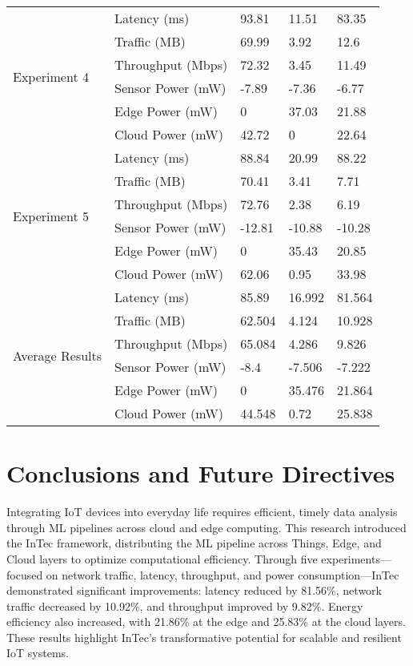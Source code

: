 \documentclass[11pt]{article}
\begin{document}
\begin{table}[t]
{\begin{tabular}{@{}lllll@{}}
				\midrule
				\multirow{6}{*}{Experiment 4} & Latency (ms) & 93.81 & 11.51 & 83.35 \\
				& Traffic (MB) & 69.99 & 3.92 & 12.6 \\
				& Throughput (Mbps) & 72.32 & 3.45 & 11.49 \\
				& Sensor Power (mW) & -7.89 & -7.36 & -6.77 \\
				& Edge Power (mW) & 0 & 37.03 & 21.88 \\
				& Cloud Power (mW) & 42.72 & 0 & 22.64 \\
				\midrule
				\multirow{6}{*}{Experiment 5} & Latency (ms) & 88.84 & 20.99 & 88.22 \\
				& Traffic (MB) & 70.41 & 3.41 & 7.71 \\
				& Throughput (Mbps) & 72.76 & 2.38 & 6.19 \\
				& Sensor Power (mW) & -12.81 & -10.88 & -10.28 \\
				& Edge Power (mW) & 0 & 35.43 & 20.85 \\
				& Cloud Power (mW) & 62.06 & 0.95 & 33.98 \\
				\midrule
				\multirow{6}{*}{Average Results} & Latency (ms) & 85.89 & 16.992 & 81.564 \\
				& Traffic (MB) & 62.504 & 4.124 & 10.928 \\
				& Throughput (Mbps) & 65.084 & 4.286 & 9.826 \\
				& Sensor Power (mW) & -8.4 & -7.506 & -7.222 \\
				& Edge Power (mW) & 0 & 35.476 & 21.864 \\
				& Cloud Power (mW) & 44.548 & 0.72 & 25.838 \\
				\bottomrule
			\end{tabular}
		}
	\end{table}
	
	\section{Conclusions and Future Directives}
	Integrating IoT devices into everyday life requires efficient, timely data analysis
	through ML pipelines across cloud and edge computing. This research introduced
	the InTec framework, distributing the ML pipeline across Things, Edge, and Cloud
	layers to optimize computational efficiency. Through five experiments—focused on
	network traffic, latency, throughput, and power consumption—InTec demonstrated
	significant improvements: latency reduced by 81.56\%, network traffic decreased by
	10.92\%, and throughput improved by 9.82\%. Energy efficiency also increased, with
	21.86\% at the edge and 25.83\% at the cloud layers. These results highlight InTec’s
	transformative potential for scalable and resilient IoT systems.
	
\end{document}
